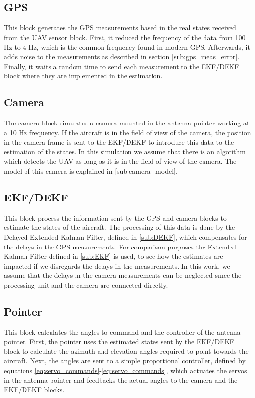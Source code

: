 \subsection{GPS}
This block generates the GPS measurements based in the real states received from the UAV sensor block. First, it reduced the frequency of the data from 100 Hz to 4 Hz, which is the common frequency found in modern GPS. Afterwards, it adds noise to the measurements as described in section \ref{sub:gps_meas_error}. Finally, it waits a random time to send each measurement to the EKF/DEKF block where they are implemented in the estimation.
\pagebreak
\subsection{Camera}
The camera block simulates a camera mounted in the antenna pointer working at a 10 Hz frequency. If the aircraft is in the field of view of the camera, the position in the camera frame is sent to the EKF/DEKF to introduce this data to the estimation of the states. In this simulation we assume that there is an algorithm which detects the UAV as long as it is in the field of view of the camera. The model of this camera is explained in \ref{sub:camera_model}.

\subsection{EKF/DEKF}
This block process the information sent by the GPS and camera blocks to estimate the states of the aircraft. The processing of this data is done by the Delayed Extended Kalman Filter, defined in \ref{sub:DEKF}, which compensates for the delays in the GPS measurements. For comparison purposes the Extended Kalman Filter defined in \ref{sub:EKF} is used, to see how the estimates are impacted if we disregards the delays in the measurements.
In this work, we assume that the delays in the camera measurements can be neglected since the processing unit and the camera are connected directly.  

\subsection{Pointer}
This block calculates the angles to command and the controller of the antenna pointer. First, the pointer uses the estimated states sent by the EKF/DEKF block to calculate the azimuth and elevation angles required to point towards the aircraft. Next, the angles are sent to a simple proportional controller, defined by equations \ref{eq:servo_commands}-\ref{eq:servo_commands}, which actuates the servos in the antenna pointer and feedbacks the actual angles to the camera and the EKF/DEKF blocks. 
\pagebreak
